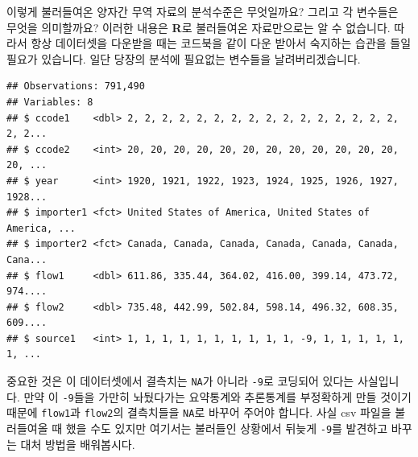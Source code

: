 \documentclass[]{book}
\newenvironment{Shaded}{\begin{snugshade}}{\end{snugshade}}
\newcommand{\CommentTok}[1]{\textcolor[rgb]{0.56,0.35,0.01}{\textit{#1}}}
\newcommand{\DecValTok}[1]{\textcolor[rgb]{0.00,0.00,0.81}{#1}}
\newcommand{\KeywordTok}[1]{\textcolor[rgb]{0.13,0.29,0.53}{\textbf{#1}}}
\newcommand{\NormalTok}[1]{#1}
\newcommand{\OperatorTok}[1]{\textcolor[rgb]{0.81,0.36,0.00}{\textbf{#1}}}
\newcommand{\OtherTok}[1]{\textcolor[rgb]{0.56,0.35,0.01}{#1}}
\newcommand{\StringTok}[1]{\textcolor[rgb]{0.31,0.60,0.02}{#1}}
\begin{document}
이렇게 불러들여온 양자간 무역 자료의 분석수준은 무엇일까요? 그리고 각 변수들은 무엇을 의미할까요? 이러한 내용은 \textbf{R}로 불러들여온 자료만으로는 알 수 없습니다. 따라서 항상 데이터셋을 다운받을 때는 코드북을 같이 다운 받아서 숙지하는 습관을 들일 필요가 있습니다. 일단 당장의 분석에 필요없는 변수들을 날려버리겠습니다.

\begin{Shaded}
\end{Shaded}

\begin{verbatim}
## Observations: 791,490
## Variables: 8
## $ ccode1    <dbl> 2, 2, 2, 2, 2, 2, 2, 2, 2, 2, 2, 2, 2, 2, 2, 2, 2, 2...
## $ ccode2    <int> 20, 20, 20, 20, 20, 20, 20, 20, 20, 20, 20, 20, 20, ...
## $ year      <int> 1920, 1921, 1922, 1923, 1924, 1925, 1926, 1927, 1928...
## $ importer1 <fct> United States of America, United States of America, ...
## $ importer2 <fct> Canada, Canada, Canada, Canada, Canada, Canada, Cana...
## $ flow1     <dbl> 611.86, 335.44, 364.02, 416.00, 399.14, 473.72, 974....
## $ flow2     <dbl> 735.48, 442.99, 502.84, 598.14, 496.32, 608.35, 609....
## $ source1   <int> 1, 1, 1, 1, 1, 1, 1, 1, 1, 1, -9, 1, 1, 1, 1, 1, 1, ...
\end{verbatim}

중요한 것은 이 데이터셋에서 결측치는 \texttt{NA}가 아니라 \texttt{-9}로 코딩되어 있다는 사실입니다. 만약 이 \texttt{-9}들을 가만히 놔뒀다가는 요약통계와 추론통계를 부정확하게 만들 것이기 때문에 \texttt{flow1}과 \texttt{flow2}의 결측치들을 \texttt{NA}로 바꾸어 주어야 합니다. 사실 csv 파일을 불러들여올 때 했을 수도 있지만 여기서는 불러들인 상황에서 뒤늦게 \texttt{-9}를 발견하고 바꾸는 대처 방법을 배워봅시다.

\begin{Shaded}
\end{Shaded}
\end{document}

